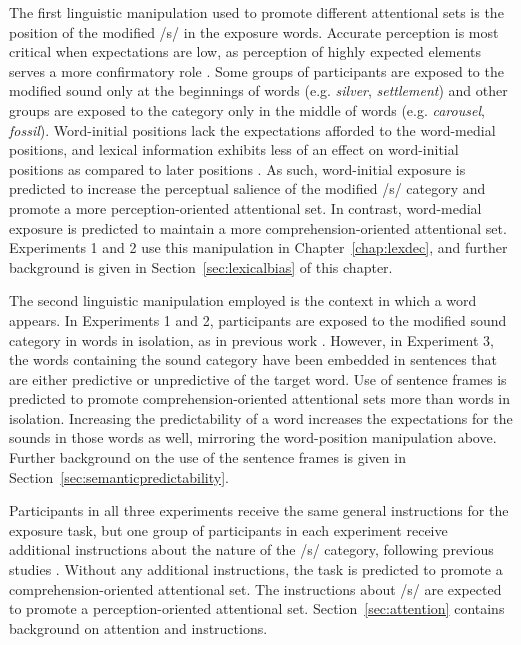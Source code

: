 The first linguistic manipulation used to promote different attentional sets is the position of the modified /s/ in the exposure words.  
Accurate perception is most critical when expectations are low, as perception of highly expected elements serves a more confirmatory role \citep{Marslen-Wilson1978, Gow1995}.
Some groups of participants are exposed to the modified sound only at the beginnings of words (e.g. \emph{silver}, \emph{settlement}) and other groups are exposed to the category only in the middle of words (e.g. \emph{carousel}, \emph{fossil}).
Word-initial positions lack the expectations afforded to the word-medial positions, and lexical information exhibits less of an effect on word-initial positions as compared to later positions \citep{Pitt2006}.
As such, word-initial exposure is predicted to increase the perceptual salience of the modified /s/ category and promote a more perception-oriented attentional set.
In contrast, word-medial exposure is predicted to maintain a more comprehension-oriented attentional set.
Experiments 1 and 2 use this manipulation in Chapter~\ref{chap:lexdec}, and further background is given in Section~\ref{sec:lexicalbias} of this chapter.

The second linguistic manipulation employed is the context in which a word appears.  
In Experiments 1 and 2, participants are exposed to the modified sound category in words in isolation, as in previous work \citep{Norris2003}.  
However, in Experiment 3, the words containing the sound category have been embedded in sentences that are either predictive or unpredictive of the target word.
Use of sentence frames is predicted to promote comprehension-oriented attentional sets more than words in isolation.
Increasing the predictability of a word increases the expectations for the sounds in those words as well, mirroring the word-position manipulation above.
Further background on the use of the sentence frames is given in Section~\ref{sec:semanticpredictability}.

Participants in all three experiments receive the same general instructions for the exposure task, but one group of participants in each experiment receive additional instructions about the nature of the /s/ category, following previous studies \citep{Pitt2012}.
Without any additional instructions, the task is predicted to promote a comprehension-oriented attentional set.
The instructions about /s/ are expected to promote a perception-oriented attentional set.
Section~\ref{sec:attention} contains background on attention and instructions.

